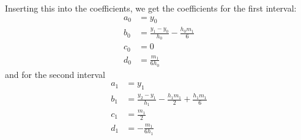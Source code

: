 \documentclass[12pt,letterpaper]{article}
\begin{document}
Inserting this into the coefficients, we get the coefficients for the first interval:
\begin{subequations}
\begin{align}
a_0 & = y_0 \\
b_0 & = \frac{y_{1}-y_{0}}{h_{0}} - \frac{h_{0} m_{1}}{6} \\
c_0 & = 0 \\
d_0 & = \frac{m_{1}}{6 h_{0}}
\end{align}
\end{subequations}
and for the second interval
\begin{subequations}
\begin{align}
a_1 & = y_1 \\
b_1 & = \frac{y_{2}-y_{1}}{h_{1}} - \frac{h_{1} m_{1}}{2} + \frac{h_{1} m_{1}}{6} \\
c_1 & = \frac{m_{1}}{2} \\
d_1 & = -\frac{m_{1}}{6 h_{1}}
\end{align}
\end{subequations}
\end{document}
